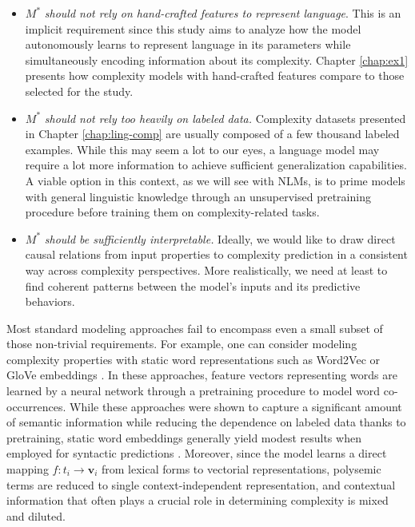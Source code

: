 \documentclass[a4paper, nobind]{templates/ociamthesis}
\begin{document}
\begin{itemize}
\item
  \(M^*\) \emph{should not rely on hand-crafted features to represent language}. This is an implicit requirement since this study aims to analyze how the model autonomously learns to represent language in its parameters while simultaneously encoding information about its complexity. Chapter \ref{chap:ex1} presents how complexity models with hand-crafted features compare to those selected for the study.
\item
  \(M^*\) \emph{should not rely too heavily on labeled data.} Complexity datasets presented in Chapter \ref{chap:ling-comp} are usually composed of a few thousand labeled examples. While this may seem a lot to our eyes, a language model may require a lot more information to achieve sufficient generalization capabilities. A viable option in this context, as we will see with NLMs, is to prime models with general linguistic knowledge through an unsupervised pretraining procedure before training them on complexity-related tasks.
\item
  \(M^*\) \emph{should be sufficiently interpretable.} Ideally, we would like to draw direct causal relations from input properties to complexity prediction in a consistent way across complexity perspectives. More realistically, we need at least to find coherent patterns between the model's inputs and its predictive behaviors.
\end{itemize}

Most standard modeling approaches fail to encompass even a small subset of those non-trivial requirements. For example, one can consider modeling complexity properties with static word representations \autocite{turian-etal-2010-word} such as Word2Vec or GloVe embeddings \autocites{mikolov-etal-2013-efficient}{pennington-etal-2014-glove}. In these approaches, feature vectors representing words are learned by a neural network through a pretraining procedure to model word co-occurrences. While these approaches were shown to capture a significant amount of semantic information while reducing the dependence on labeled data thanks to pretraining, static word embeddings generally yield modest results when employed for syntactic predictions \autocite{andreas-klein-2014-much}. Moreover, since the model learns a direct mapping \(f: t_i \rightarrow \textbf{v}_i\) from lexical forms to vectorial representations, polysemic terms are reduced to single context-independent representation, and contextual information that often plays a crucial role in determining complexity is mixed and diluted.
\end{document}
